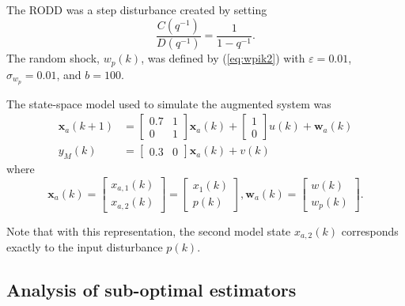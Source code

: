 The \gls{RODD} was a step disturbance created by setting
\begin{equation}
	\frac{C(q^{-1})}{D(q^{-1})} = \frac{1}{1-q^{-1}}.
\end{equation}
The random shock, $w_p(k)$, was defined by (\ref{eq:wpik2}) with $\varepsilon=0.01$, $\sigma_{w_p}=0.01$, and $b=100$.

The state-space model used to simulate the augmented system was
\begin{equation} \label{eq:sim-sys-siso-ss-aug}
	\begin{split}
	\mathbf{x}_{a}(k+1) & =\left[\begin{array}{cc}
		0.7 & 1 \\
		0 & 1
	\end{array}\right] \mathbf{x}_{a}(k)+\left[\begin{array}{l}
		1 \\
		0
	\end{array}\right] u(k) + \mathbf{w}_{a}(k) \\
	y_M(k) & =\left[\begin{array}{cc}
	0.3 & 0
\end{array}\right] \mathbf{x}_{a}(k) + v(k)
\end{split}
\end{equation}
where
\begin{equation} \label{eq:sim-sys-siso-ss-aug2}
		\mathbf{x}_{a}(k) = \left[\begin{array}{l}
			x_{a,1}(k) \\
			x_{a,2}(k)
		\end{array}\right] = \left[\begin{array}{l}
		x_{1}(k) \\
		p(k)
	\end{array}\right], \mathbf{w}_{a}(k) = \left[\begin{array}{l}
	w(k) \\
	w_{p}(k)
\end{array}\right] .
\end{equation}

Note that with this representation, the second model state $x_{a,2}(k)$ corresponds exactly to the input disturbance $p(k)$.

\subsection{Analysis of sub-optimal estimators} \label{sec:sim-obs-lin-1-SKF-analysis}

